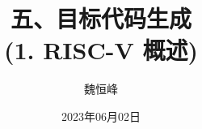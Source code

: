 \documentclass[handout]{beamer}
\title[目标代码生成]{五、目标代码生成 \\ (1. RISC-V 概述)}
\author[魏恒峰]{\large 魏恒峰}
\institute{hfwei@nju.edu.cn}
\date{2023年06月02日}
\begin{document}
\maketitle



\thankyou{}

\end{document}
